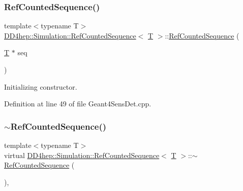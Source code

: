 \subsubsection{\texorpdfstring{Ref\+Counted\+Sequence()}{RefCountedSequence()}\hspace{0.1cm}{\footnotesize\ttfamily [2/2]}}
{\footnotesize\ttfamily template$<$typename T$>$ \\
\hyperlink{class_d_d4hep_1_1_simulation_1_1_ref_counted_sequence}{D\+D4hep\+::\+Simulation\+::\+Ref\+Counted\+Sequence}$<$ \hyperlink{class_t}{T} $>$\+::\hyperlink{class_d_d4hep_1_1_simulation_1_1_ref_counted_sequence}{Ref\+Counted\+Sequence} (\begin{DoxyParamCaption}\item[{\hyperlink{class_t}{T} $\ast$}]{seq }\end{DoxyParamCaption})\hspace{0.3cm}{\ttfamily [inline]}}



Initializing constructor. 



Definition at line 49 of file Geant4\+Sens\+Det.\+cpp.

\hypertarget{class_d_d4hep_1_1_simulation_1_1_ref_counted_sequence_a316644b6bcf4dd7e2b57588a9779bf59}{}\label{class_d_d4hep_1_1_simulation_1_1_ref_counted_sequence_a316644b6bcf4dd7e2b57588a9779bf59} 
\subsubsection{\texorpdfstring{$\sim$\+Ref\+Counted\+Sequence()}{~RefCountedSequence()}}
{\footnotesize\ttfamily template$<$typename T$>$ \\
virtual \hyperlink{class_d_d4hep_1_1_simulation_1_1_ref_counted_sequence}{D\+D4hep\+::\+Simulation\+::\+Ref\+Counted\+Sequence}$<$ \hyperlink{class_t}{T} $>$\+::$\sim$\hyperlink{class_d_d4hep_1_1_simulation_1_1_ref_counted_sequence}{Ref\+Counted\+Sequence} (\begin{DoxyParamCaption}{ }\end{DoxyParamCaption})\hspace{0.3cm}{\ttfamily [inline]}, {\ttfamily [virtual]}}



